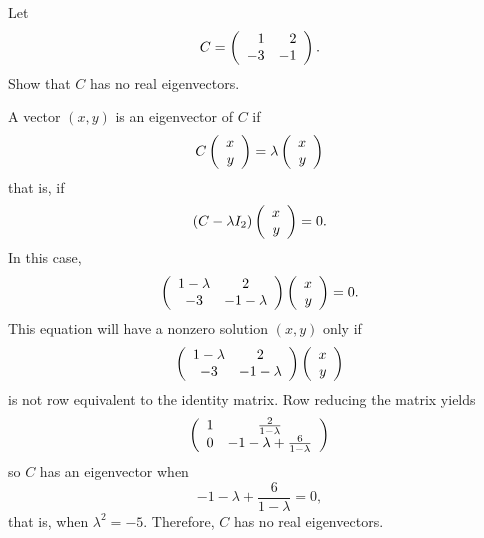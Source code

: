 \documentclass{ximera}
\begin{document}
\begin{exercise} \label{c4.5.4}
Let
\[
C=\left(\begin{array}{rr} 1 & 2\\ -3 &-1\end{array}\right).
\]
Show that $C$ has no real eigenvectors.

\begin{solution}

A vector $(x,y)$ is an eigenvector of $C$ if
\[ C\left(\begin{array}{r} x \\ y\end{array}\right) = \lambda\left(\begin{array}{r} x \\ y\end{array}\right) \]
that is, if
\[ (C - \lambda I_2)\left(\begin{array}{r} x \\ y\end{array}\right) = 0. \]
In this case,
\[ \left(\begin{array}{cc} 1 - \lambda & 2\\ -3 &-1 - \lambda\end{array}\right)
\left(\begin{array}{r} x \\ y\end{array}\right) = 0. \]
This equation will have a nonzero solution $(x,y)$ only if
\[ \left(\begin{array}{cc} 1 - \lambda & 2\\ -3 &-1 - \lambda\end{array}\right)\left(\begin{array}{r} x \\ y\end{array}\right) \]
is not row equivalent to the identity matrix.
Row reducing the matrix yields
\[ \left(\begin{array}{cc} 1 & \frac{2}{1 - \lambda}\\ 0 &-1 - \lambda + \frac{6}{1-\lambda}\end{array}\right) \]
so $C$ has an eigenvector when
\[ -1 - \lambda + \frac{6}{1-\lambda} = 0, \]
that is, when $\lambda^2 = -5$.  Therefore, $C$ has no real 
eigenvectors.

\end{solution}
\end{exercise}
\end{document}
